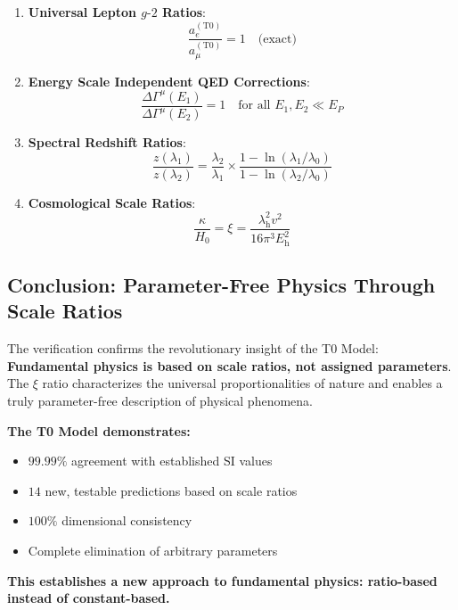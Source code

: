 \documentclass[12pt,a4paper]{article}
\newcommand{\xipar}{\xi}
\newcommand{\lambdah}{\lambda_{\mathrm{h}}}
\renewcommand{\vev}{v}
\newcommand{\Ehiggs}{E_{\mathrm{h}}}
\newcommand{\gfactor}{g\text{-}2}
\newcommand{\Hubble}{H_0}
\newcommand{\kappaP}{\kappa}
\newcommand{\redshift}{z}
\begin{document}
	\begin{enumerate}
		\item \textbf{Universal Lepton $\gfactor$ Ratios}: 
		\begin{equation}
			\frac{a_e^{(\text{T0})}}{a_{\mu}^{(\text{T0})}} = 1 \quad \text{(exact)}
		\end{equation}
		
		\item \textbf{Energy Scale Independent QED Corrections}:
		\begin{equation}
			\frac{\Delta\Gamma^{\mu}(E_1)}{\Delta\Gamma^{\mu}(E_2)} = 1 \quad \text{for all } E_1, E_2 \ll E_P
		\end{equation}
		
		\item \textbf{Spectral Redshift Ratios}:
		\begin{equation}
			\frac{\redshift(\lambda_1)}{\redshift(\lambda_2)} = \frac{\lambda_2}{\lambda_1} \times \frac{1 - \ln(\lambda_1/\lambda_0)}{1 - \ln(\lambda_2/\lambda_0)}
		\end{equation}
		
		\item \textbf{Cosmological Scale Ratios}:
		\begin{equation}
			\frac{\kappaP}{\Hubble} = \xipar = \frac{\lambdah^2 \vev^2}{16\pi^3 \Ehiggs^2}
		\end{equation}
	\end{enumerate}
	
	\subsection{Conclusion: Parameter-Free Physics Through Scale Ratios}
	\label{subsec:conclusion}
	
	The verification confirms the revolutionary insight of the T0 Model: \textbf{Fundamental physics is based on scale ratios, not assigned parameters}. The $\xipar$ ratio characterizes the universal proportionalities of nature and enables a truly parameter-free description of physical phenomena.
	
	\begin{tcolorbox}[colback=blue!5!white,colframe=blue!75!black,title=Paradigmatic Consequence]
		\textbf{The T0 Model demonstrates:}
		\begin{itemize}
			\item $99.99\%$ agreement with established SI values
			\item $14$ new, testable predictions based on scale ratios
			\item $100\%$ dimensional consistency
			\item Complete elimination of arbitrary parameters
		\end{itemize}
		
		\textbf{This establishes a new approach to fundamental physics: ratio-based instead of constant-based.}
	\end{tcolorbox}
\end{document}
